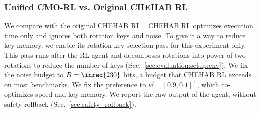 
\subsubsection{Unified CMO-RL vs. Original CHEHAB RL
\label{sec:evaluation:unified-vs-original}}

We compare \ToolName{} with the original CHEHAB RL~\cite{ChehabRL}. CHEHAB RL optimizes execution time only and ignores both rotation keys and noise. To give it a way to reduce key memory, we enable its rotation key selection pass for this experiment only. This pass runs after the RL agent and decomposes rotations into power-of-two rotations to reduce the number of keys (Sec.~\ref{sec:evaluation:setup:env}). We fix the noise budget to $B = \inred{230}$ bits, a budget that CHEHAB RL exceeds on most benchmarks. We fix the preference to $\vec{w} = [0.9, 0.1]^{\top}$, which co-optimizes speed and key memory. We report the raw output of the agent, without safety rollback (Sec.~\ref{sec:safety_rollback}).

